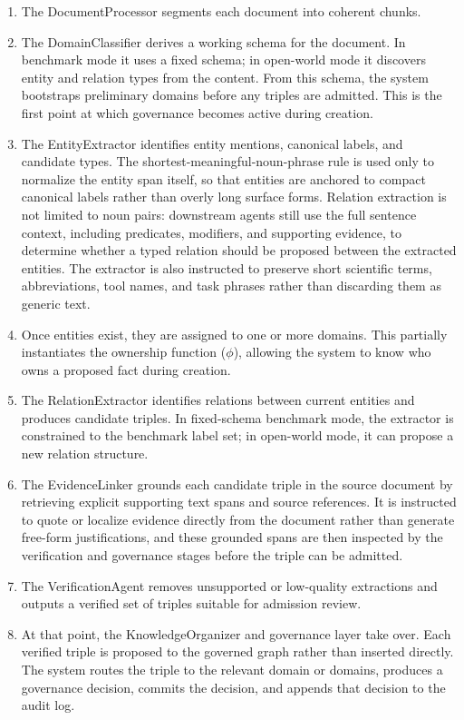 \begin{enumerate}
\def\labelenumi{\arabic{enumi}.}
\item
  The DocumentProcessor segments each document into coherent chunks.
\item
  The DomainClassifier derives a working schema for the document. In
  benchmark mode it uses a fixed schema; in open-world mode it discovers
  entity and relation types from the content. From this schema, the
  system bootstraps preliminary domains before any triples are admitted.
  This is the first point at which governance becomes active during
  creation.
\item
  The EntityExtractor identifies entity mentions, canonical labels, and
  candidate types. The shortest-meaningful-noun-phrase rule is used only
  to normalize the entity span itself, so that entities are anchored to
  compact canonical labels rather than overly long surface forms.
  Relation extraction is not limited to noun pairs: downstream agents
  still use the full sentence context, including predicates, modifiers,
  and supporting evidence, to determine whether a typed relation should
  be proposed between the extracted entities. The extractor is also
  instructed to preserve short scientific terms, abbreviations, tool
  names, and task phrases rather than discarding them as generic text.
\item
  Once entities exist, they are assigned to one or more domains. This
  partially instantiates the ownership function ($\phi$), allowing the system
  to know who owns a proposed fact during creation.
\item
  The RelationExtractor identifies relations between current entities
  and produces candidate triples. In fixed-schema benchmark mode, the
  extractor is constrained to the benchmark label set; in open-world
  mode, it can propose a new relation structure.
\item
  The EvidenceLinker grounds each candidate triple in the source
  document by retrieving explicit supporting text spans and source
  references. It is instructed to quote or localize evidence directly
  from the document rather than generate free-form justifications, and
  these grounded spans are then inspected by the verification and
  governance stages before the triple can be admitted.
\item
  The VerificationAgent removes unsupported or low-quality extractions
  and outputs a verified set of triples suitable for admission review.
\item
  At that point, the KnowledgeOrganizer and governance layer take over.
  Each verified triple is proposed to the governed graph rather than
  inserted directly. The system routes the triple to the relevant domain
  or domains, produces a governance decision, commits the decision, and
  appends that decision to the audit log.
\end{enumerate}

